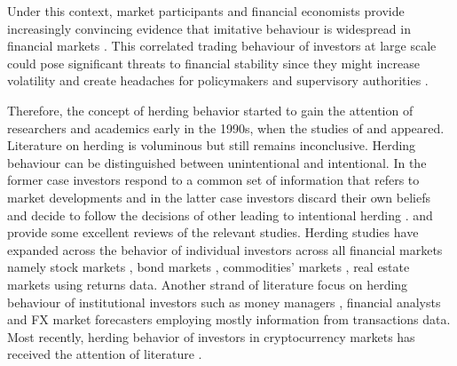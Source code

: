 \documentclass[
  letterpaper,
  DIV=11,
  numbers=noendperiod]{scrartcl}
\begin{document}
Under this context, market participants and financial economists provide
increasingly convincing evidence that imitative behaviour is widespread
in financial markets \citep{devenow1996rational}. This correlated
trading behaviour of investors at large scale could pose significant
threats to financial stability since they might increase volatility and
create headaches for policymakers and supervisory authorities
\citep{demirer2015commodity}.

Therefore, the concept of herding behavior started to gain the attention
of researchers and academics early in the 1990s, when the studies of
\citet{banerjee1992simple} and \citet{bikhchandani1992theory} appeared.
Literature on herding is voluminous but still remains inconclusive.
Herding behaviour can be distinguished between unintentional and
intentional. In the former case investors respond to a common set of
information that refers to market developments and in the latter case
investors discard their own beliefs and decide to follow the decisions
of other leading to intentional herding \citep{bikchandani2000herd}.
\citet{spyrou2013herding} and \citet{komalasari2022herding} provide some
excellent reviews of the relevant studies. Herding studies have expanded
across the behavior of individual investors across all financial markets
namely stock markets \citep[see inter
alia][]{demirer2006does, chiang2010empirical, ukpong2021determinants},
bond markets \citep[see inter alia][]{galariotis2016herd}, commodities'
markets
\citep{demirer2015commodity, babalos2015herding, babalos2015commodity, junior2020analyzing, youssef2022oil},
real estate markets \citep[see inter
alia][]{philippas2013herding, lesame2024herding} using returns data.
Another strand of literature focus on herding behaviour of institutional
investors such as money managers \citep{jiang2018does}, financial
analysts \citep{leece2017effects} and FX market forecasters
\citep{tsuchiya2015herding} employing mostly information from
transactions data. Most recently, herding behavior of investors in
cryptocurrency markets has received the attention of literature
\citep[see inter alia][]{bouri2019herding}.
\end{document}
